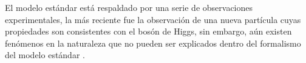 
El modelo estándar está respaldado por una serie de observaciones experimentales, la más reciente fue la observación de una nueva partícula cuyas propiedades son consistentes con el bosón de Higgs, sin embargo, aún existen fenómenos en la naturaleza que no pueden ser explicados dentro del formalismo del modelo estándar%
.



